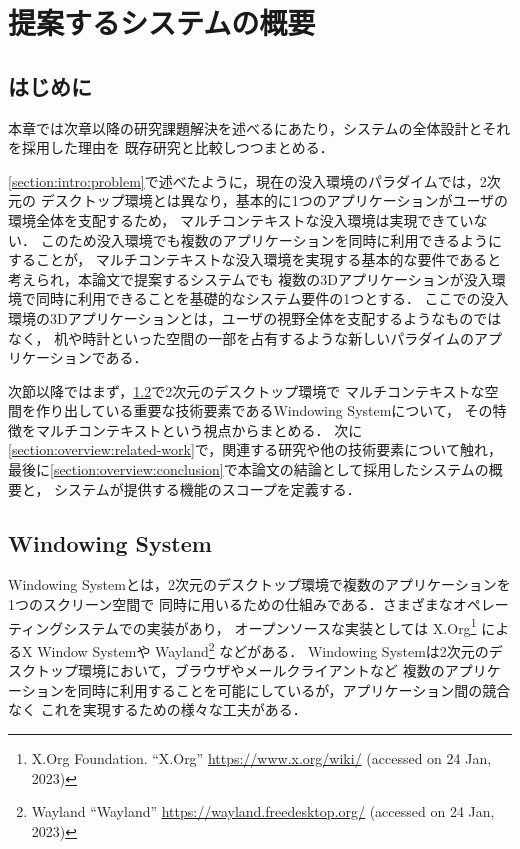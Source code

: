 \chapter{提案するシステムの概要}


\section{はじめに}

本章では次章以降の研究課題解決を述べるにあたり，システムの全体設計とそれを採用した理由を
既存研究と比較しつつまとめる．

\ref{section:intro:problem}で述べたように，現在の没入環境のパラダイムでは，2次元の
デスクトップ環境とは異なり，基本的に1つのアプリケーションがユーザの環境全体を支配するため，
マルチコンテキストな没入環境は実現できていない．
このため没入環境でも複数のアプリケーションを同時に利用できるようにすることが，
マルチコンテキストな没入環境を実現する基本的な要件であると考えられ，本論文で提案するシステムでも
複数の3Dアプリケーションが没入環境で同時に利用できることを基礎的なシステム要件の1つとする．
ここでの没入環境の3Dアプリケーションとは，ユーザの視野全体を支配するようなものではなく，
机や時計といった空間の一部を占有するような新しいパラダイムのアプリケーションである．

次節以降ではまず，\ref{section:overview:windowing-system}で2次元のデスクトップ環境で
マルチコンテキストな空間を作り出している重要な技術要素であるWindowing Systemについて，
その特徴をマルチコンテキストという視点からまとめる．
次に\ref{section:overview:related-work}で，関連する研究や他の技術要素について触れ，
最後に\ref{section:overview:conclusion}で本論文の結論として採用したシステムの概要と，
システムが提供する機能のスコープを定義する．

\section{Windowing System}
\label{section:overview:windowing-system}

Windowing Systemとは，2次元のデスクトップ環境で複数のアプリケーションを1つのスクリーン空間で
同時に用いるための仕組みである．さまざまなオペレーティングシステムでの実装があり，
オープンソースな実装としては X.Org\footnote{X.Org Foundation. ``X.Org'' \url{https://www.x.org/wiki/} (accessed on 24 Jan, 2023)}
によるX Window System\cite{x-window-system}や
Wayland\footnote{Wayland ``Wayland'' \url{https://wayland.freedesktop.org/} (accessed on 24 Jan, 2023)}
などがある．
Windowing Systemは2次元のデスクトップ環境において，ブラウザやメールクライアントなど
複数のアプリケーションを同時に利用することを可能にしているが，アプリケーション間の競合なく
これを実現するための様々な工夫がある．

